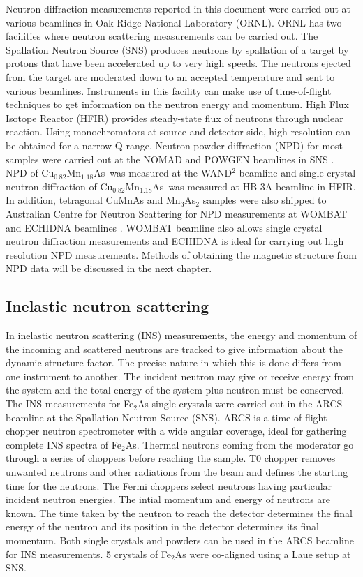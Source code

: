 \documentclass[letterpaper,10pt,doublespacing,edeposit]{uiucthesis2020}
\newcommand*{\cumnas}{Cu$_{0.82}$Mn$_{1.18}$As}
\begin{document}
\begin{mainmatter}
Neutron diffraction measurements reported in this document were carried out at various beamlines in Oak Ridge National Laboratory (ORNL). ORNL has two facilities where neutron scattering measurements can be carried out. The Spallation Neutron Source (SNS) \cite{mason2006spallation} produces neutrons by spallation of a target by protons that have been accelerated up to very high speeds. The neutrons ejected from the target are moderated down to an accepted temperature and sent to various beamlines. Instruments in this facility can make use of time-of-flight techniques to get information on the neutron energy and momentum. High Flux Isotope Reactor (HFIR) provides steady-state flux of neutrons through nuclear reaction. Using monochromators at source and detector side, high resolution can be obtained for a narrow Q-range. Neutron powder diffraction (NPD) for most samples were carried out at the NOMAD and POWGEN beamlines in SNS \cite{NEUEFEIND201268,Huq:in5025}. NPD of \cumnas\ was measured at the WAND$^2$ beamline \cite{Frontzek_new} and single crystal neutron diffraction of \cumnas\ was measured at HB-3A beamline in HFIR. In addition, tetragonal CuMnAs and Mn$_3$As$_2$ samples were also shipped to Australian Centre for Neutron Scattering for NPD measurements at WOMBAT and ECHIDNA beamlines \cite{STUDER20061013,Liss2006,Avdeev2018}. WOMBAT beamline also allows single crystal neutron diffraction measurements and ECHIDNA is ideal for carrying out high resolution NPD measurements. Methods of obtaining the magnetic structure from NPD data will be discussed in the next chapter.


\subsection{Inelastic neutron scattering}


In inelastic neutron scattering (INS) measurements, the energy and momentum of the incoming and scattered neutrons are tracked to give information about the dynamic structure factor. The precise nature in which this is done differs from one instrument to another. The incident neutron may give or receive energy from the system and the total energy of the system plus neutron must be conserved. The INS measurements for Fe$_2$As single crystals were carried out in the ARCS beamline \cite{doi:10.1063/1.3680104} at the Spallation Neutron Source (SNS). ARCS is a time-of-flight chopper neutron spectrometer with a wide angular coverage, ideal for gathering complete INS spectra of Fe$_2$As. Thermal neutrons coming from the moderator go through a series of choppers before reaching the sample. T0 chopper removes unwanted neutrons and other radiations from the beam and defines the starting time for the neutrons. The Fermi choppers select neutrons having particular incident neutron energies. The intial momentum and energy of neutrons are known. The time taken by the neutron to reach the detector determines the final energy of the neutron and its position in the detector determines its final momentum. Both single crystals and powders can be used in the ARCS beamline for INS measurements. 5 crystals of Fe$_2$As were co-aligned using a Laue setup at SNS.


\end{mainmatter}
\end{document}
